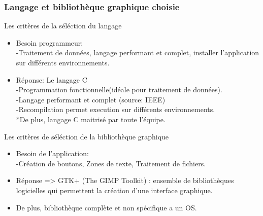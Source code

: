 \documentclass[10pt,xcolor=table]{beamer}
\begin{document}
\begin{frame}
  \frametitle{Langage et bibliothèque graphique choisie}  
  \begin{block}{Les critères de la séléction du langage}
    \begin{itemize}
    \pause
  \item Besoin programmeur: \\
  -Traitement de données, langage performant et complet, installer l'application sur différents environnements. \\
  \pause
  \item Réponse: Le langage C \\
  -Programmation fonctionnelle(idéale pour traitement de données). \\
  -Langage performant et complet (source: IEEE)\\
  -Recompilation permet execution sur différents environnements.  \\
  \vspace*{1mm}
  \pause
   *De plus, langage C maitrisé par toute l'équipe. \\
    \end{itemize}
  \end{block}
 
  \pause
 
    \begin{block}{Les critères de séléction de la bibliothèque graphique}
    \begin{itemize}
    \pause
  \item Besoin de l'application: \\
                -Création de boutons, Zones de texte, Traitement de fichiers. \\
    \pause
  \item Réponse => GTK+ (The GIMP Toolkit) : ensemble de bibliothèques logicielles qui permettent la création d'une interface graphique.
        
  \item De plus, bibliothèque complète et non spécifique a un OS.
    \end{itemize}
  \end{block}
\end{frame}
\end{document}

